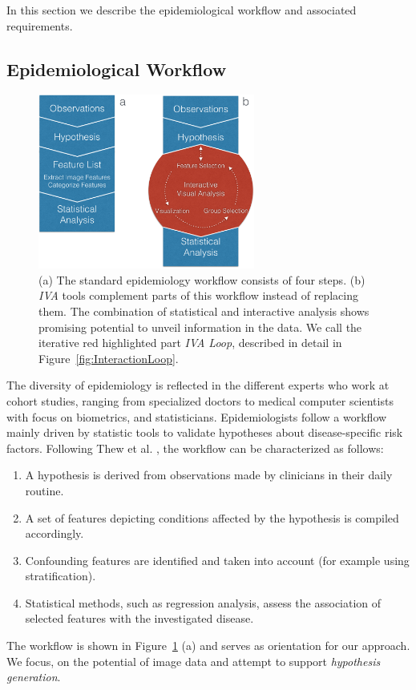 \documentclass[journal]{style/vgtc} 			          %
\begin{document}
In this section we describe the epidemiological workflow and associated requirements.

\subsection{Epidemiological Workflow} \label{EpidemiologicalWorkflow}
\begin{figure}[htb]
 \centering
 \includegraphics[width=2.8in]{figures/workflow_comparison}
 \caption{
 (a) The standard epidemiology workflow consists of four steps.
 (b) \emph{IVA} tools complement parts of this workflow instead of replacing them.
 The combination of statistical and interactive analysis shows promising potential to unveil information in the data.
 We call the iterative red highlighted part \emph{IVA Loop}, described in detail in Figure~\ref{fig:InteractionLoop}.
 }
  \label{fig:WorkflowComparison}
\end{figure}
The diversity of epidemiology is reflected in the different experts who work at cohort studies, ranging from specialized doctors to medical computer scientists with focus on biometrics, and statisticians.
%
Epidemiologists follow a workflow mainly driven by statistic tools to validate hypotheses about disease-specific risk factors.
%
Following Thew et al. \cite{Thew2009}, the workflow can be characterized as follows:
%
\begin{enumerate}\itemsep0.1em
	\item A hypothesis is derived from observations made by clinicians in their daily routine.
%
	\item A set of features depicting conditions affected by the hypothesis is compiled accordingly.
%
	\item Confounding features are identified and taken into account (for example using stratification).
%
	\item Statistical methods, such as regression analysis, assess the association of selected features with the investigated disease.
%
\end{enumerate}
The workflow is shown in Figure~\ref{fig:WorkflowComparison} (a) and serves as orientation for our approach. %
%
We focus, on the potential of image data and attempt to support \emph{hypothesis generation}.
\end{document}
